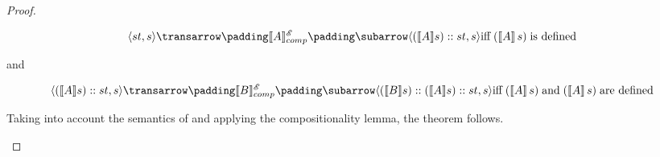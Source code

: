 \begin{proof}
\begin{itemize}
      \[
        \trans{\inbr{st, s}}{\sembr{A}^{\mathscr E}_{comp}}{\inbr{(\sembr{A}s)::st, s}} \mbox{iff} \; (\sembr{A}\,s)\; \mbox{is defined}
      \]

      and

      \[
        \trans{\inbr{(\sembr{A}s)::st, s}}{\sembr{B}^{\mathscr E}_{comp}}{\inbr{(\sembr{B}s)::(\sembr{A}s)::st, s}} \mbox{iff} \; (\sembr{A}\,s) \;\mbox{and}\; (\sembr{A}\,s) \; \mbox{are defined}
      \]

      Taking into account the semantics of  and applying the compositionality lemma, the theorem follows.
  \end{itemize}
\end{proof}
